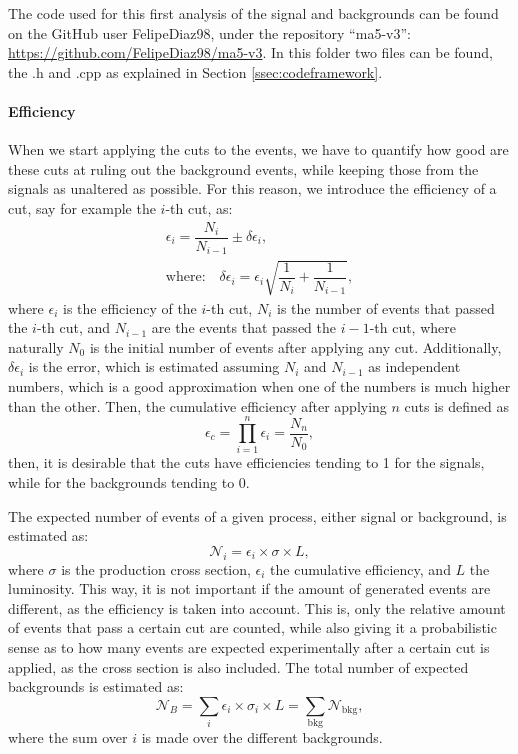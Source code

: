 The code used for this first analysis of the signal and backgrounds can be found on the GitHub user FelipeDiaz98, under the repository ``ma5-v3'': \url{https://github.com/FelipeDiaz98/ma5-v3}. In this folder two files can be found, the .h and .cpp as explained in Section \ref{ssec:codeframework}.

\paragraph{Efficiency} \label{ssec:efficiency}

When we start applying the cuts to the events, we have to quantify how good are these cuts at ruling out the background events, while keeping those from the signals as unaltered as possible. For this reason, we introduce the efficiency of a cut, say for example the $i$-th cut, as:
\begin{gather}
\label{eqeff}
    \epsilon_i = \dfrac{N_i}{N_{i-1}} \pm \delta \epsilon_i, \\
\label{eqefferr}
    \textrm{where:} \quad \delta \epsilon_i = \epsilon_i \sqrt{\dfrac{1}{N_i} + \dfrac{1}{N_{i-1}}},
\end{gather}
where $\epsilon_i$ is the efficiency of the $i$-th cut, $N_i$ is the number of events that passed the $i$-th cut, and $N_{i-1}$ are the events that passed the $i-1$-th cut, where naturally $N_0$ is the initial number of events after applying any cut. Additionally, $\delta\epsilon_i$ is the error, which is estimated assuming $N_i$ and $N_{i-1}$ as independent numbers, which is a good approximation when one of the numbers is much higher than the other. Then, the cumulative efficiency after applying $n$ cuts is defined as
\begin{equation*}
    \epsilon_c = \prod_{i=1}^{n}\epsilon_i = \dfrac{N_n}{N_0},
\end{equation*}
then, it is desirable that the cuts have efficiencies tending to 1 for the signals, while for the backgrounds tending to 0. 

The expected number of events of a given process, either signal or background, is estimated as:
\begin{equation}
\label{eqnumberofevents}
    \mathcal{N}_i = \epsilon_i\times \sigma\times L,
\end{equation}
where $\sigma$ is the production cross section, $\epsilon_i$ the cumulative efficiency, and $L$ the luminosity. This way, it is not important if the amount of generated events are different, as the efficiency is taken into account. This is, only the relative amount of events that pass a certain cut are counted, while also giving it a probabilistic sense as to how many events are expected experimentally after a certain cut is applied, as the cross section is also included. The total number of expected backgrounds is estimated as:
\begin{equation}
\label{eqnumberofeventsbkg}
    \mathcal{N}_B = \sum_i \epsilon_i \times \sigma_i \times L = \sum_{\textrm{bkg}}\mathcal{N}_{\textrm{bkg}},
\end{equation}
where the sum over $i$ is made over the different backgrounds.

